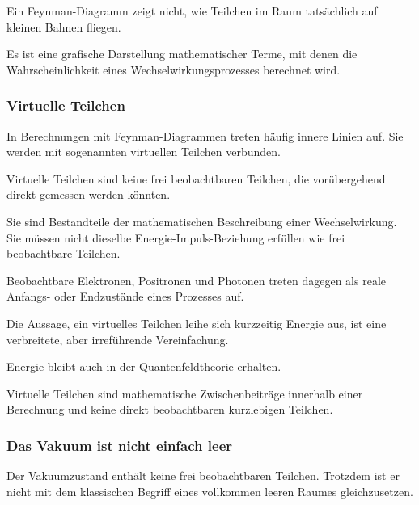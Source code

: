\begin{DidacticBox}
	\label{box:feynman_diagramme_keine_fotografien}
	
	Ein Feynman-Diagramm zeigt nicht, wie Teilchen im Raum tatsächlich auf
	kleinen Bahnen fliegen.
	
	Es ist eine grafische Darstellung mathematischer Terme, mit denen die
	Wahrscheinlichkeit eines Wechselwirkungsprozesses berechnet wird.
\end{DidacticBox}

\subsubsection*{Virtuelle Teilchen}

In Berechnungen mit Feynman-Diagrammen treten häufig innere Linien auf.
Sie werden mit sogenannten virtuellen Teilchen%
 verbunden.

Virtuelle Teilchen sind keine frei beobachtbaren Teilchen, die
vorübergehend direkt gemessen werden könnten.

Sie sind Bestandteile der mathematischen Beschreibung einer
Wechselwirkung. Sie müssen nicht dieselbe Energie-Impuls-Beziehung
erfüllen wie frei beobachtbare Teilchen.

Beobachtbare Elektronen, Positronen und Photonen treten dagegen als
reale Anfangs- oder Endzustände eines Prozesses auf.

\begin{NoteBox}
	\label{box:vorsicht_virtuelle_teilchen}
	
	Die Aussage, ein virtuelles Teilchen leihe sich kurzzeitig Energie aus,
	ist eine verbreitete, aber irreführende Vereinfachung.
	
	Energie bleibt auch in der Quantenfeldtheorie erhalten.
	
	Virtuelle Teilchen sind mathematische Zwischenbeiträge innerhalb einer
	Berechnung und keine direkt beobachtbaren kurzlebigen Teilchen.
\end{NoteBox}

\subsubsection*{Das Vakuum ist nicht einfach leer}

Der Vakuumzustand enthält keine frei beobachtbaren Teilchen. Trotzdem
ist er nicht mit dem klassischen Begriff eines vollkommen leeren
Raumes gleichzusetzen.

